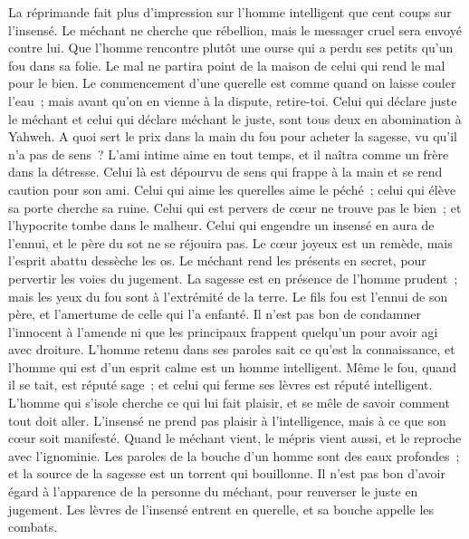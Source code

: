 \begin{multicols}{2}
La réprimande fait plus d'impression sur l'homme intelligent que cent coups sur l'insensé.
Le méchant ne cherche que rébellion, mais le messager cruel sera envoyé contre lui.
Que l'homme rencontre plutôt une ourse qui a perdu ses petits qu'un fou dans sa folie.
Le mal ne partira point de la maison de celui qui rend le mal pour le bien.
Le commencement d'une querelle est comme quand on laisse couler l'eau~; mais avant qu'on en vienne à la dispute, retire-toi.
Celui qui déclare juste le méchant et celui qui déclare méchant le juste, sont tous deux en abomination à Yahweh.
A quoi sert le prix dans la main du fou pour acheter la sagesse, vu qu'il n'a pas de sens~?
L'ami intime aime en tout temps, et il naîtra comme un frère dans la détresse.
Celui là est dépourvu de sens qui frappe à la main et se rend caution pour son ami.
Celui qui aime les querelles aime le péché~; celui qui élève sa porte cherche sa ruine.
Celui qui est pervers de cœur ne trouve pas le bien~; et l'hypocrite tombe dans le malheur.
Celui qui engendre un insensé en aura de l'ennui, et le père du sot ne se réjouira pas.
Le cœur joyeux est un remède, mais l'esprit abattu dessèche les os.
Le méchant rend les présents en secret, pour pervertir les voies du jugement.
La sagesse est en présence de l'homme prudent~; mais les yeux du fou sont à l'extrémité de la terre.
Le fils fou est l'ennui de son père, et l'amertume de celle qui l'a enfanté.
Il n'est pas bon de condamner l'innocent à l'amende ni que les principaux frappent quelqu'un pour avoir agi avec droiture.
L'homme retenu dans ses paroles sait ce qu'est la connaissance, et l'homme qui est d'un esprit calme est un homme intelligent.
Même le fou, quand il se tait, est réputé sage~; et celui qui ferme ses lèvres est réputé intelligent.
\VerseOne{}L'homme qui s'isole cherche ce qui lui fait plaisir, et se mêle de savoir comment tout doit aller.
L'insensé ne prend pas plaisir à l'intelligence, mais à ce que son cœur soit manifesté.
Quand le méchant vient, le mépris vient aussi, et le reproche avec l'ignominie.
Les paroles de la bouche d'un homme sont des eaux profondes~; et la source de la sagesse est un torrent qui bouillonne.
Il n'est pas bon d'avoir égard à l'apparence de la personne du méchant, pour renverser le juste en jugement.
Les lèvres de l'insensé entrent en querelle, et sa bouche appelle les combats.

\end{multicols}
